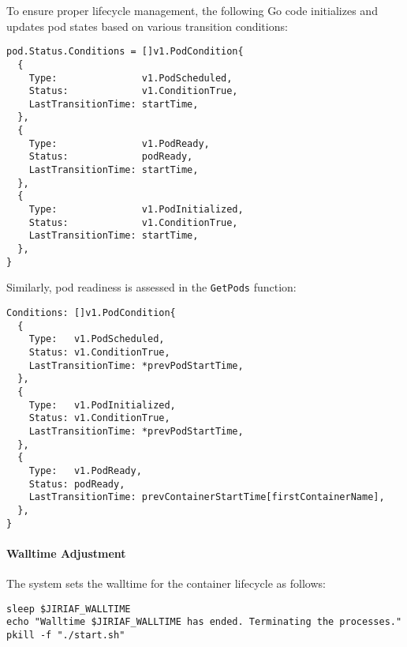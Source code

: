 To ensure proper lifecycle management, the following Go code initializes and updates pod states based on various transition conditions:

\begin{verbatim}
pod.Status.Conditions = []v1.PodCondition{
  {
    Type:               v1.PodScheduled,
    Status:             v1.ConditionTrue,
    LastTransitionTime: startTime,
  },
  {
    Type:               v1.PodReady,
    Status:             podReady,
    LastTransitionTime: startTime,
  },
  {
    Type:               v1.PodInitialized,
    Status:             v1.ConditionTrue,
    LastTransitionTime: startTime,
  },
}
\end{verbatim}

Similarly, pod readiness is assessed in the \texttt{GetPods} function:

\begin{verbatim}
Conditions: []v1.PodCondition{
  {
    Type:   v1.PodScheduled,
    Status: v1.ConditionTrue,
    LastTransitionTime: *prevPodStartTime,
  },
  {
    Type:   v1.PodInitialized,
    Status: v1.ConditionTrue,
    LastTransitionTime: *prevPodStartTime,
  },
  {
    Type:   v1.PodReady,
    Status: podReady,
    LastTransitionTime: prevContainerStartTime[firstContainerName],
  },
}
\end{verbatim}

\paragraph{Walltime Adjustment}
The system sets the walltime for the container lifecycle as follows:

\begin{verbatim}
sleep $JIRIAF_WALLTIME
echo "Walltime $JIRIAF_WALLTIME has ended. Terminating the processes."
pkill -f "./start.sh"
\end{verbatim}
